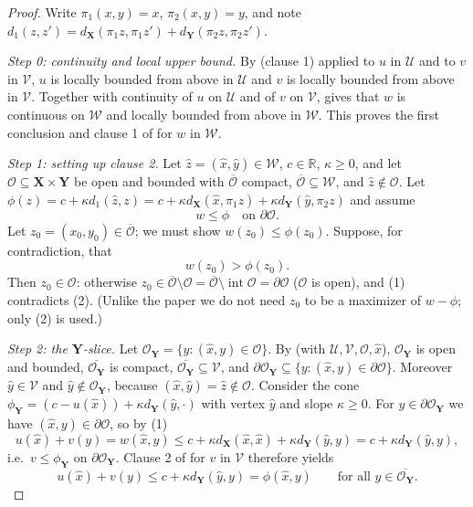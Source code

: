 \begin{proof}
Write $\pi_1(x,y)=x$, $\pi_2(x,y)=y$, and note $d_1(z,z')=d_{\mathbf X}(\pi_1z,\pi_1z')+d_{\mathbf Y}(\pi_2z,\pi_2z')$.

\emph{Step 0: continuity and local upper bound.} By  (clause 1) applied to $u$ in $\mathcal U$ and to $v$ in $\mathcal V$, $u$ is locally bounded from above in $\mathcal U$ and $v$ is locally bounded from above in $\mathcal V$. Together with continuity of $u$ on $\mathcal U$ and of $v$ on $\mathcal V$,  gives that $w$ is continuous on $\mathcal W$ and locally bounded from above in $\mathcal W$. This proves the first conclusion and clause 1 of  for $w$ in $\mathcal W$.

\emph{Step 1: setting up clause 2.} Let $\hat z=(\hat x,\hat y)\in\mathcal W$, $c\in\mathbb R$, $\kappa\ge0$, and let $\mathcal O\subseteq\mathbf X\times\mathbf Y$ be open and bounded with $\overline{\mathcal O}$ compact, $\overline{\mathcal O}\subseteq\mathcal W$, and $\hat z\notin\mathcal O$. Let $\phi(z)=c+\kappa d_1(\hat z,z)=c+\kappa d_{\mathbf X}(\hat x,\pi_1z)+\kappa d_{\mathbf Y}(\hat y,\pi_2z)$ and assume
\[
w\le\phi\quad\text{on }\partial\mathcal O. \tag{1}
\]
Let $z_0=(x_0,y_0)\in\overline{\mathcal O}$; we must show $w(z_0)\le\phi(z_0)$. Suppose, for contradiction, that
\[
w(z_0)>\phi(z_0). \tag{2}
\]
Then $z_0\in\mathcal O$: otherwise $z_0\in\overline{\mathcal O}\setminus\mathcal O=\overline{\mathcal O}\setminus\operatorname{int}\mathcal O=\partial\mathcal O$ ($\mathcal O$ is open), and (1) contradicts (2). (Unlike the paper we do not need $z_0$ to be a maximizer of $w-\phi$; only (2) is used.)

\emph{Step 2: the $\mathbf Y$-slice.} Let $\mathcal O_{\mathbf Y}=\{y:(\hat x,y)\in\mathcal O\}$. By  (with $\mathcal U,\mathcal V,\mathcal O,\hat x$), $\mathcal O_{\mathbf Y}$ is open and bounded, $\overline{\mathcal O_{\mathbf Y}}$ is compact, $\overline{\mathcal O_{\mathbf Y}}\subseteq\mathcal V$, and $\partial\mathcal O_{\mathbf Y}\subseteq\{y:(\hat x,y)\in\partial\mathcal O\}$. Moreover $\hat y\in\mathcal V$ and $\hat y\notin\mathcal O_{\mathbf Y}$, because $(\hat x,\hat y)=\hat z\notin\mathcal O$. Consider the cone $\phi_{\mathbf Y}=(c-u(\hat x))+\kappa d_{\mathbf Y}(\hat y,\cdot)$ with vertex $\hat y$ and slope $\kappa\ge0$. For $y\in\partial\mathcal O_{\mathbf Y}$ we have $(\hat x,y)\in\partial\mathcal O$, so by (1)
\[
u(\hat x)+v(y)=w(\hat x,y)\le c+\kappa d_{\mathbf X}(\hat x,\hat x)+\kappa d_{\mathbf Y}(\hat y,y)=c+\kappa d_{\mathbf Y}(\hat y,y),
\]
i.e.\ $v\le\phi_{\mathbf Y}$ on $\partial\mathcal O_{\mathbf Y}$. Clause 2 of  for $v$ in $\mathcal V$ therefore yields
\[
u(\hat x)+v(y)\le c+\kappa d_{\mathbf Y}(\hat y,y)=\phi(\hat x,y)\qquad\text{for all }y\in\overline{\mathcal O_{\mathbf Y}}. \tag{3}
\]


\end{proof}
